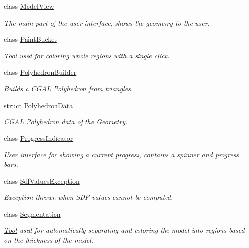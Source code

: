 \begin{DoxyCompactItemize}
class \mbox{\hyperlink{classpepr3d_1_1_model_view}{Model\+View}}
\begin{DoxyCompactList}\small\item\em The main part of the user interface, shows the geometry to the user. \end{DoxyCompactList}\item 
class \mbox{\hyperlink{classpepr3d_1_1_paint_bucket}{Paint\+Bucket}}
\begin{DoxyCompactList}\small\item\em \mbox{\hyperlink{classpepr3d_1_1_tool}{Tool}} used for coloring whole regions with a single click. \end{DoxyCompactList}\item 
class \mbox{\hyperlink{classpepr3d_1_1_polyhedron_builder}{Polyhedron\+Builder}}
\begin{DoxyCompactList}\small\item\em Builds a \mbox{\hyperlink{namespace_c_g_a_l}{C\+G\+AL}} Polyhedron from triangles. \end{DoxyCompactList}\item 
struct \mbox{\hyperlink{structpepr3d_1_1_polyhedron_data}{Polyhedron\+Data}}
\begin{DoxyCompactList}\small\item\em \mbox{\hyperlink{namespace_c_g_a_l}{C\+G\+AL}} Polyhedron data of the \mbox{\hyperlink{classpepr3d_1_1_geometry}{Geometry}}. \end{DoxyCompactList}\item 
class \mbox{\hyperlink{classpepr3d_1_1_progress_indicator}{Progress\+Indicator}}
\begin{DoxyCompactList}\small\item\em User interface for showing a current progress, contains a spinner and progress bars. \end{DoxyCompactList}\item 
class \mbox{\hyperlink{classpepr3d_1_1_sdf_values_exception}{Sdf\+Values\+Exception}}
\begin{DoxyCompactList}\small\item\em Exception thrown when S\+DF values cannot be computed. \end{DoxyCompactList}\item 
class \mbox{\hyperlink{classpepr3d_1_1_segmentation}{Segmentation}}
\begin{DoxyCompactList}\small\item\em \mbox{\hyperlink{classpepr3d_1_1_tool}{Tool}} used for automatically separating and coloring the model into regions based on the thickness of the model. \end{DoxyCompactList}\item 

\end{DoxyCompactItemize}
